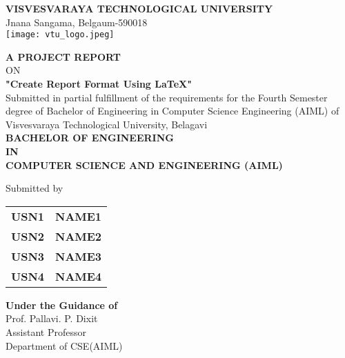 \documentclass[12pt, a4paper]{article} %
\begin{document}
	
	\begin{titlepage} %
		\begin{center} %
			
			\textbf{{\large VISVESVARAYA TECHNOLOGICAL UNIVERSITY}}\\
			{\normalsize Jnana Sangama, Belgaum-590018}\\
			\vspace{0.3in}
			\texttt{[image: vtu\_logo.jpeg]}\\
			\vspace{0.3in}
			
			\textbf{A PROJECT REPORT} \\
			ON \\
			\vspace{0.2in}
			\textbf{{\large "Create Report Format Using LaTeX"}}\\
			\vspace{0.1in}
			{\small Submitted in partial fulfillment of the requirements for the Fourth Semester degree of 
              Bachelor of Engineering in Computer Science Engineering (AIML) of \\ Visvesvaraya Technological University, Belagavi}\\
			\vspace{0.1in}
			\textbf{BACHELOR OF ENGINEERING\\IN\\COMPUTER SCIENCE AND ENGINEERING (AIML)}\\
			\vspace{0.2in}
			
			Submitted by\\
			\vspace{0.08in}
			\begin{tabular}{ll}
				\textbf{USN1} & \textbf{NAME1}\\
				\textbf{USN2} & \textbf{NAME2}\\
				\textbf{USN3} & \textbf{NAME3}\\
                                           \textbf{USN4} & \textbf{NAME4}\\
			\end{tabular}
			
			\vspace{0.2in}
			
			\textbf{Under the Guidance of}\\
			Prof. Pallavi. P. Dixit\\
			Assistant Professor\\
			Department of CSE(AIML)\\
			

\end{center}
\end{titlepage}
\end{document}
